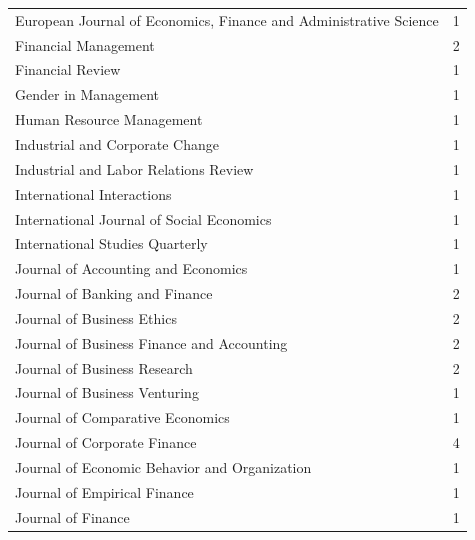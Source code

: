 \documentclass[english]{article}
\begin{document}
\begin{appendices}
\begin{table}
{\begin{tabular}{lc}
	European Journal of Economics, Finance and Administrative Science &      1           \\
	Financial Management                                              &      2           \\
	Financial Review                                                  &      1           \\
	Gender in Management                                              &      1           \\
	Human Resource Management                                         &      1           \\
	Industrial and Corporate Change                                   &      1           \\
	Industrial and Labor Relations Review                             &      1           \\
	International Interactions                                        &      1           \\
	International Journal of Social Economics                         &      1           \\
	International Studies Quarterly                                   &      1           \\
	Journal of Accounting and Economics                               &      1           \\
	Journal of Banking and Finance                                    &      2           \\
	Journal of Business Ethics                                        &      2           \\
	Journal of Business Finance and Accounting                        &      2           \\
	Journal of Business Research                                      &      2           \\
	Journal of Business Venturing                                     &      1           \\
	Journal of Comparative Economics                                  &      1           \\
	Journal of Corporate Finance                                      &      4           \\
	Journal of Economic Behavior and Organization                     &      1           \\
	Journal of Empirical Finance                                      &      1           \\
	Journal of Finance                                                &      1           \\

\end{tabular}}
\end{table}
\end{appendices}
\end{document}
